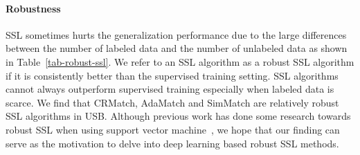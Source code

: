 \documentclass{article}
\begin{document}
\begin{table}[t!]
\centering
\caption{This table shows how many times an SSL algorithm is worse than supervised training, where the numbers of total settings are 9, 10, and 9 for CV, NLP, and Audio respectively.}
\label{tab-robust-ssl}
\end{table}


\paragraph{Robustness}
SSL sometimes hurts the generalization performance due to the large differences between the number of labeled data and the number of unlabeled data as shown in Table~\ref{tab-robust-ssl}. We refer to an SSL algorithm as a robust SSL algorithm if it is consistently better than the supervised training setting. SSL algorithms cannot always outperform supervised training especially when labeled data is scarce. We find that CRMatch, AdaMatch and SimMatch are relatively robust SSL algorithms in USB. Although previous work has done some research towards robust SSL when using support vector machine~\cite{LiZ15pami, noble2006support}, we hope that our finding can serve as the motivation to delve into deep learning based robust SSL methods.
\end{document}
